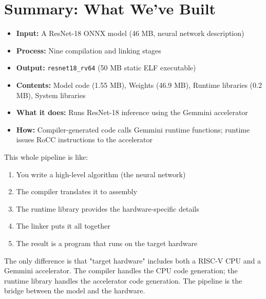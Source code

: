 \documentclass[12pt,a4paper]{article}
\begin{document}
\section{Summary: What We've Built}

\begin{itemize}[leftmargin=*]
  \item \textbf{Input:} A ResNet-18 ONNX model (46 MB, neural network description)
  \item \textbf{Process:} Nine compilation and linking stages
  \item \textbf{Output:} \texttt{resnet18\_rv64} (50 MB static ELF executable)
  \item \textbf{Contents:} Model code (1.55 MB), Weights (46.9 MB), Runtime libraries (0.2 MB), System libraries
  \item \textbf{What it does:} Runs ResNet-18 inference using the Gemmini accelerator
  \item \textbf{How:} Compiler-generated code calls Gemmini runtime functions; runtime issues RoCC instructions to the accelerator
\end{itemize}

\begin{analogyenv}
This whole pipeline is like:
\begin{enumerate}
  \item You write a high-level algorithm (the neural network)
  \item The compiler translates it to assembly
  \item The runtime library provides the hardware-specific details
  \item The linker puts it all together
  \item The result is a program that runs on the target hardware
\end{enumerate}

The only difference is that "target hardware" includes both a RISC-V CPU and a Gemmini accelerator. The compiler handles the CPU code generation; the runtime library handles the accelerator code generation. The pipeline is the bridge between the model and the hardware.
\end{analogyenv}
\end{document}
